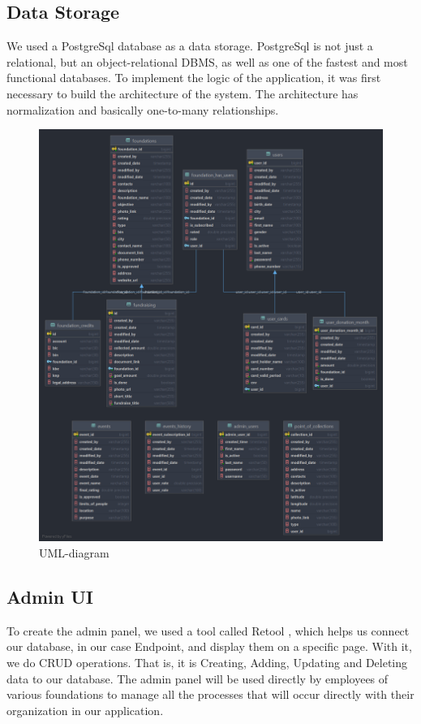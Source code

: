 \subsection{Data Storage}
    
    We used a PostgreSql database as a data storage. PostgreSql is not just a relational, but an object-relational DBMS, as well as one of the fastest and most functional databases. To implement the logic of the application, it was first necessary to build the architecture of the system. The architecture has normalization and basically one-to-many relationships.
    
    \begin{figure}[h]
        \centering
        \includegraphics[width=13cm]{figures/uml.png}
        \caption{UML-diagram}
        \label{fig:Uml diagram}
    \end{figure}

\subsection{Admin UI}

To create the admin panel, we used a tool called Retool \cite{Retool}, which helps us connect our database, in our case Endpoint, and display them on a specific page. With it, we do CRUD operations. That is, it is Creating, Adding, Updating and Deleting data to our database. The admin panel will be used directly by employees of various foundations to manage all the processes that will occur directly with their organization in our application.

